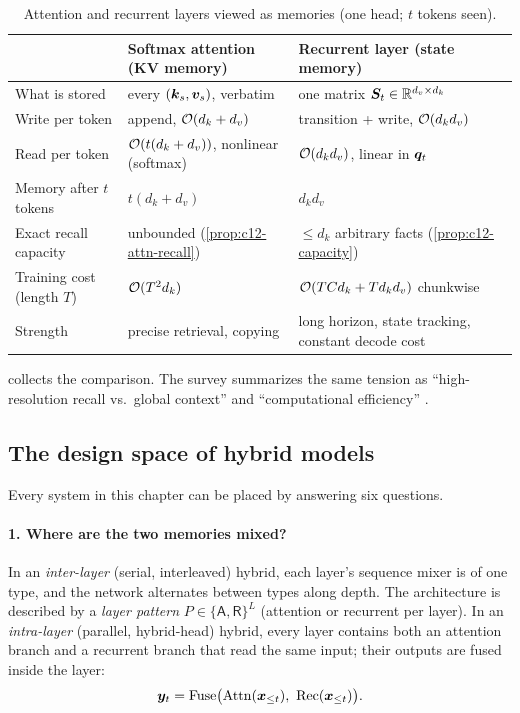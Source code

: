 \begin{table}[t]
\centering\small
\caption{Attention and recurrent layers viewed as memories (one head; $t$ tokens seen).}
\label{tab:c12-two-memories}
\begin{tabularx}{\textwidth}{@{}lXX@{}}
\toprule
 & Softmax attention (KV memory) & Recurrent layer (state memory) \\
\midrule
What is stored & every $(\bm{k}_s,\bm{v}_s)$, verbatim & one matrix $\bm{S}_t\in\mathbb{R}^{d_v\times d_k}$ \\
Write per token & append, $\mathcal{O}(d_k+d_v)$ & transition + write, $\mathcal{O}(d_kd_v)$ \\
Read per token & $\mathcal{O}(t(d_k+d_v))$, nonlinear (softmax) & $\mathcal{O}(d_kd_v)$, linear in $\bm{q}_t$ \\
Memory after $t$ tokens & $t(d_k+d_v)$ & $d_kd_v$ \\
Exact recall capacity & unbounded (\cref{prop:c12-attn-recall}) & $\le d_k$ arbitrary facts (\cref{prop:c12-capacity}) \\
Training cost (length $T$) & $\mathcal{O}(T^2d_k)$ & $\mathcal{O}(TCd_k+Td_kd_v)$ chunkwise \\
Strength & precise retrieval, copying & long horizon, state tracking, constant decode cost \\
\bottomrule
\end{tabularx}
\end{table}

 collects the comparison. The survey summarizes the same tension as
``high-resolution recall vs.\ global context'' and ``computational efficiency''
\citep[Section~V-A(f)]{zhoubian2026memory}.

\subsection{The design space of hybrid models}\label{sec:c12-design-space}

Every system in this chapter can be placed by answering six questions.

\paragraph{1. Where are the two memories mixed?}
\begin{definition}\label{def:c12-granularity}
In an \emph{inter-layer} (serial, interleaved) hybrid, each layer's sequence mixer is of one
type, and the network alternates between types along depth. The architecture is described by
a \emph{layer pattern} $P\in\{\mathsf{A},\mathsf{R}\}^L$ (attention or recurrent per layer). In an
\emph{intra-layer} (parallel, hybrid-head) hybrid, every layer contains both an attention
branch and a recurrent branch that read the same input; their outputs are fused inside the
layer:
\begin{equation}\label{eq:c12-parallel}
  \vy_t = \mathrm{Fuse}\big(\mathrm{Attn}(\vx_{\le t}),\ \mathrm{Rec}(\vx_{\le t})\big).
\end{equation}
\end{definition}

